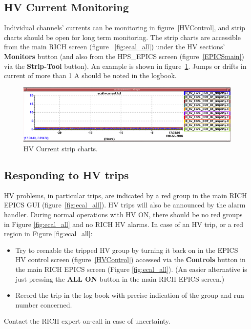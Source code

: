 \documentclass[12pt]{article}
\begin{document}
   \subsection{HV Current Monitoring}
   Individual channels' currents can be monitoring in figure~\ref{HVControl}, and strip charts should be open for long term monitoring.  The strip charts are accessible from the main RICH screen (figure ~\ref{fig:ecal_all}) under the HV sections' {\bf Monitors} button (and also from the HPS\_EPICS screen (figure~\ref{EPICSmain}) via the {\bf Strip-Tool} button).  An example is shown in figure~\ref{fig:hvcurrentstrips}.  Jumps or drifts in current of more than 1 A should be noted in the logbook.

   \begin{figure}[htbp]\centering
       \includegraphics[width=16cm]{pics/hvcurrentstrip.png}
       \caption{HV Current strip charts.\label{fig:hvcurrentstrips}}
   \end{figure}


   \subsection{Responding to HV trips}

   HV problems, in particular trips, are indicated by a red group in the main RICH EPICS GUI (figure~\ref{fig:ecal_all}).  HV trips will also be announced by the alarm handler.  During normal operations with HV ON, there should be no red groups in Figure \ref{fig:ecal_all} and no RICH HV alarms.  In case of an HV trip, or a red region in Figure \ref{fig:ecal_all}:
\begin{itemize}
    \item Try to reenable the tripped HV group by turning it back on in the EPICS HV control screen (figure~\ref{HVControl}) accessed via the {\bf Controls} button in the main RICH EPICS screen (Figure \ref{fig:ecal_all}).  (An easier alternative is just pressing the {\bf ALL ON}
button in the main RICH EPICS screen.)
    \item Record the trip in the log book with precise indication of the group and run
        number concerned. 
\end{itemize}
Contact the RICH expert on-call in case of uncertainty.
      
\end{document}

